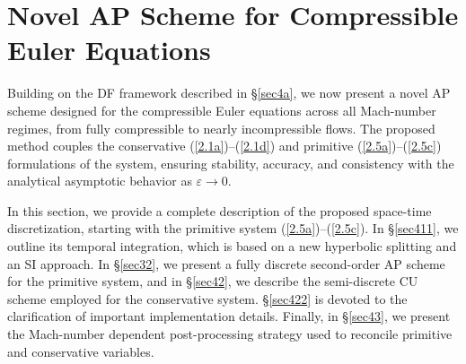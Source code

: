 \documentclass[preprint,12pt]{elsarticle}
\newcommand{\ve}{\varepsilon}
\newcommand\eref[1]{(\ref{#1})}
\begin{document}
\section{Novel AP Scheme for Compressible Euler Equations}\label{sec4}
Building on the DF framework described in \S\ref{sec4a}, we now present a novel AP scheme designed for the compressible Euler equations
across all Mach-number regimes, from fully compressible to nearly incompressible flows. The proposed method couples the
conservative \eref{2.1a}--\eref{2.1d} and primitive \eref{2.5a}--\eref{2.5c} formulations of the system, ensuring stability, accuracy, and
consistency with the analytical asymptotic behavior as $\ve\to0$.

In this section, we provide a complete description of the proposed space-time discretization, starting with the primitive system
\eref{2.5a}–\eref{2.5c}. In \S\ref{sec411}, we outline its temporal integration, which is based on a new hyperbolic splitting and an SI
approach. In \S\ref{sec32}, we present a fully discrete second-order AP scheme for the primitive system, and in \S\ref{sec42}, we describe
the semi-discrete CU scheme employed for the conservative system. \S\ref{sec422} is devoted to the clarification of important
implementation details. Finally, in \S\ref{sec43}, we present the Mach-number dependent post-processing strategy used to reconcile primitive
and conservative variables.
\end{document}
